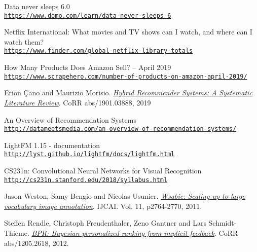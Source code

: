 \begin{thebibliography}{9}

	\hypertarget{domo}{} 
	Data never sleeps 6.0
	\\\texttt{\url{https://www.domo.com/learn/data-never-sleeps-6}}
	
	\hypertarget{finder}{} 
	Netflix International: What movies and TV shows can I watch, and where can I watch them?
	\\\texttt{\url{https://www.finder.com/global-netflix-library-totals}}

	\hypertarget{scrapehero}{} 
	How Many Products Does Amazon Sell? – April 2019
	\\\texttt{\url{https://www.scrapehero.com/number-of-products-on-amazon-april-2019/}}
	
	\hypertarget{ErionCanoMaurizioMorisio}{} 
	Erion Çano and Maurizio Morisio.
	\textit{\href{http://arxiv.org/abs/1901.03888}{Hybrid Recommender Systems: A Systematic Literature Review}}.
	CoRR abs/1901.03888, 2019
	
	\hypertarget{datameetsmedia}{} 
	An Overview of Recommendation Systems
	\\\texttt{\url{http://datameetsmedia.com/an-overview-of-recommendation-systems/}}
	
	\hypertarget{lightfm}{} 
	LightFM 1.15 - documentation
	\\\texttt{\url{http://lyst.github.io/lightfm/docs/lightfm.html}}
	
	\hypertarget{cs231n}{} 
	CS231n: Convolutional Neural Networks for Visual Recognition
	\\\texttt{\url{http://cs231n.stanford.edu/2018/syllabus.html}}
	
	\hypertarget{JasonWestonSamyBengioNicolasUsunier}{} 
	Jason Weston, Samy Bengio and Nicolas Usunier.
	\textit{\href{http://www.thespermwhale.com/jaseweston/papers/wsabie-ijcai.pdf}{Wsabie: Scaling up to large vocabulary image annotation}}.
	IJCAI. Vol. 11, p2764-2770, 2011.
	
	\hypertarget{SteffenRendleChristophFreudenthalerZenoGantnerLarsSchmidtThieme}{} 
	Steffen Rendle, Christoph Freudenthaler, Zeno Gantner and Lars Schmidt-Thieme.
	\textit{\href{http://arxiv.org/abs/1205.2618}{BPR: Bayesian personalized ranking from implicit feedback}}.
	CoRR abs/1205.2618, 2012.
	

\end{thebibliography}
